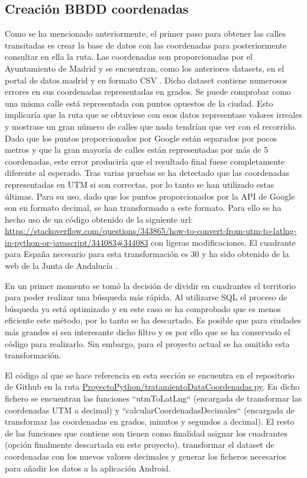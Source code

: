 \subsection{Creación BBDD coordenadas}
Como se ha mencionado anteriormente, el primer paso para obtener las calles transitadas es crear la base de datos con las coordenadas para posteriormente consultar en ella la ruta.
Las coordenadas son proporcionadas por el Ayuntamiento de Madrid y se encuentran, como los anteriores datasets, en el portal de datos.madrid y en formato CSV \cite{coordenadas_DatosMadrid}.
Dicho dataset contiene numerosos errores en sus coordenadas representadas en grados. Se puede comprobar como una misma calle está representada con puntos opuestos de la ciudad. Esto implicaría que la ruta que se obtuviese con esos datos representase valores irreales y mostrase un gran número de calles que nada tendrían que ver con el recorrido. Dado que los puntos proporcionados por Google están separados por pocos metros y que la gran mayoría de calles están representadas por más de 5 coordenadas, este error produciría que el resultado final fuese completamente diferente al esperado.
Tras varias pruebas se ha detectado que las coordenadas representadas en UTM si son correctas, por lo tanto se han utilizado estas últimas. Para su uso, dado que los puntos proporcionados por la API de Google son en formato decimal, se han transformado a este formato. Para ello se ha hecho uso de un código obtenido de la siguiente url: \url{https://stackoverflow.com/questions/343865/how-to-convert-from-utm-to-latlng-in-python-or-javascript/344083#344083} con ligeras modificaciones. El cuadrante para España necesario para esta transformación es 30 y ha sido obtenido de la web de la Junta de Andalucía \cite{UTM_cuadrante_andalucia}.

En un primer momento se tomó la decisión de dividir en cuadrantes el territorio para poder realizar una búsqueda más rápida. Al utilizarse SQL el proceso de búsqueda ya está optimizado y en este caso se ha comprobado que es menos eficiente este método, por lo tanto se ha descartado. Es posible que para ciudades más grandes si sea interesante dicho filtro y es por ello que se ha conservado el código para realizarlo. Sin embargo, para el proyecto actual se ha omitido esta transformación.

El código al que se hace referencia en esta sección se encuentra en el repositorio de Github 	\cite{githubRepositorio} en la ruta \url{ProyectoPython/tratamientoDataCoordenadas.py}.
En dicho fichero se encuentran las funciones ``utmToLatLng`` (encargada de transformar las coordenadas UTM  a decimal) y ``calcularCoordenadasDecimales`` (encargada de transformar las coordenadas en grados, minutos y segundos a decimal). El resto de las funciones que contiene son tienen como finalidad asignar los cuadrantes (opción finalmente descartada en este proyecto), transformar el dataset de coordenadas con los nuevos valores decimales y generar los ficheros necesarios para añadir los datos a la aplicación Android.

